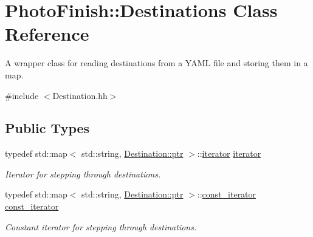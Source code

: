 \hypertarget{class_photo_finish_1_1_destinations}{}\section{Photo\+Finish\+:\+:Destinations Class Reference}
\label{class_photo_finish_1_1_destinations}


A wrapper class for reading destinations from a Y\+A\+ML file and storing them in a map.  




{\ttfamily \#include $<$Destination.\+hh$>$}

\subsection*{Public Types}
\begin{DoxyCompactItemize}
\item 
typedef std\+::map$<$ std\+::string, \hyperlink{class_photo_finish_1_1_destination_a0d282a905cd81c3f0e6d7233c9bc7774}{Destination\+::ptr} $>$\+::\hyperlink{class_photo_finish_1_1_destinations_adb2cf9240b0d2545643caa2c1d718913}{iterator} \hyperlink{class_photo_finish_1_1_destinations_adb2cf9240b0d2545643caa2c1d718913}{iterator}
\begin{DoxyCompactList}\small\item\em Iterator for stepping through destinations. \end{DoxyCompactList}\item 
typedef std\+::map$<$ std\+::string, \hyperlink{class_photo_finish_1_1_destination_a0d282a905cd81c3f0e6d7233c9bc7774}{Destination\+::ptr} $>$\+::\hyperlink{class_photo_finish_1_1_destinations_a267e114a259d98ae440074660c7086cb}{const\+\_\+iterator} \hyperlink{class_photo_finish_1_1_destinations_a267e114a259d98ae440074660c7086cb}{const\+\_\+iterator}
\begin{DoxyCompactList}\small\item\em Constant iterator for stepping through destinations. \end{DoxyCompactList}\end{DoxyCompactItemize}
